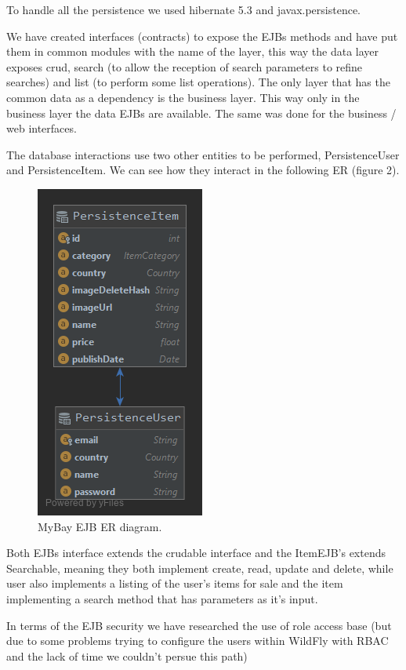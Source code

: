 \documentclass{article}
\begin{document}
\qquad To handle all the persistence we used hibernate 5.3 and javax.persistence. 

\qquad We have created interfaces (contracts) to expose the \ac{EJB}s methods and have put them in common modules with the name of the layer, this way the data layer exposes crud, search (to allow the reception of search parameters to refine searches) and list (to perform some list operations). The only layer that has the common data as a dependency is the business layer. This way only in the business layer the data \ac{EJB}s are available. The same was done for the business / web interfaces.

\qquad The database interactions use two other entities to be performed, PersistenceUser and PersistenceItem.  We can see how they interact in the following \ac{ER} (figure 2).

\begin{figure}[H]
 \centering
 \includegraphics[scale=0.4]{ER_MyBay.png}
 \caption{MyBay \ac{EJB} \ac{ER} diagram.}
 \label{fig:er}
\end{figure}

\qquad Both \ac{EJB}s interface extends the crudable interface and the ItemEJB's extends Searchable, meaning they both implement create, read, update and delete, while user also implements a listing of the user's items for sale and the item implementing a search method that has parameters as it's input.

\qquad In terms of the \ac{EJB} security we have researched the use of role access base (but due to some problems trying to configure the users within WildFly with RBAC and the lack of time we couldn't persue this path)
\end{document}
